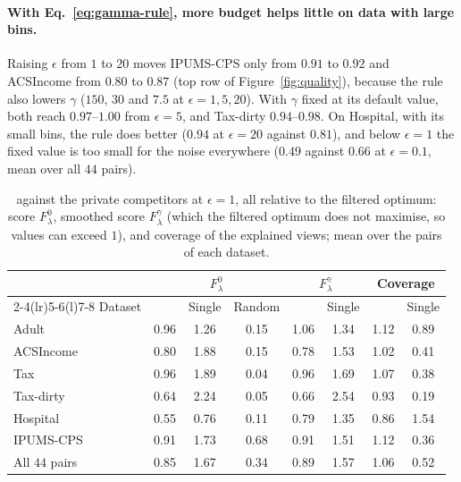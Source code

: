 \paragraph{With Eq.~\eqref{eq:gamma-rule}, more budget helps little on data with large bins.}
Raising $\epsilon$ from $1$ to $20$ moves IPUMS-CPS only from $0.91$ to $0.92$ and ACSIncome from $0.80$ to $0.87$ (top row of Figure~\ref{fig:quality}), because the rule also lowers $\gamma$ ($150$, $30$ and $7.5$ at $\epsilon=1,5,20$).
With $\gamma$ fixed at its default value, both reach $0.97$--$1.00$ from $\epsilon=5$, and Tax-dirty $0.94$--$0.98$.
On Hospital, with its small bins, the rule does better ($0.94$ at $\epsilon=20$ against $0.81$), and below $\epsilon=1$ the fixed value is too small for the noise everywhere ($0.49$ against $0.66$ at $\epsilon=0.1$, mean over all $44$ pairs).

\begin{table}[t]
\centering
\footnotesize
\caption{\sys{} against the private competitors at $\epsilon=1$, all relative to the filtered optimum: score $F^0_\lambda$, smoothed score $F^\gamma_\lambda$ (which the filtered optimum does not maximise, so values can exceed $1$), and coverage of the explained views; mean over the pairs of each dataset.}
\label{tab:competitors}
\setlength{\tabcolsep}{2.5pt}
\begin{tabular}{@{}lccccccc@{}}
\toprule
 & \multicolumn{3}{c}{$F^0_\lambda$} & \multicolumn{2}{c}{$F^\gamma_\lambda$} & \multicolumn{2}{c}{Coverage} \\
\cmidrule(lr){2-4}\cmidrule(lr){5-6}\cmidrule(l){7-8}
Dataset & \sys{} & Single & Random & \sys{} & Single & \sys{} & Single \\
\midrule
Adult      & 0.96 & 1.26 & 0.15 & 1.06 & 1.34 & 1.12 & 0.89 \\
ACSIncome  & 0.80 & 1.88 & 0.15 & 0.78 & 1.53 & 1.02 & 0.41 \\
Tax        & 0.96 & 1.89 & 0.04 & 0.96 & 1.69 & 1.07 & 0.38 \\
Tax-dirty  & 0.64 & 2.24 & 0.05 & 0.66 & 2.54 & 0.93 & 0.19 \\
Hospital   & 0.55 & 0.76 & 0.11 & 0.79 & 1.35 & 0.86 & 1.54 \\
IPUMS-CPS  & 0.91 & 1.73 & 0.68 & 0.91 & 1.51 & 1.12 & 0.36 \\
\midrule
All $44$ pairs & 0.85 & 1.67 & 0.34 & 0.89 & 1.57 & 1.06 & 0.52 \\
\bottomrule
\end{tabular}
\end{table}

